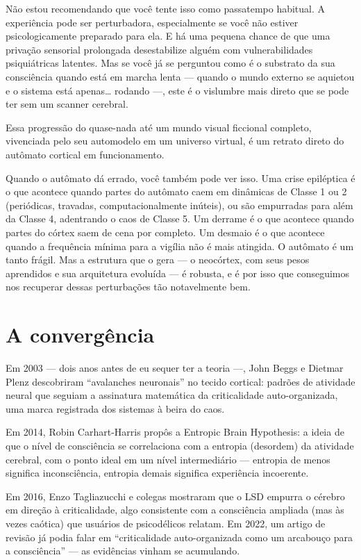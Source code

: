 \documentclass[11pt, twoside, openright]{book}
\begin{document}
Não estou recomendando que você tente isso como passatempo habitual. A experiência pode ser perturbadora, especialmente se você não estiver psicologicamente preparado para ela. E há uma pequena chance de que uma privação sensorial prolongada desestabilize alguém com vulnerabilidades psiquiátricas latentes. Mas se você já se perguntou como é o substrato da sua consciência quando está em marcha lenta --- quando o mundo externo se aquietou e o sistema está apenas… rodando ---, este é o vislumbre mais direto que se pode ter sem um scanner cerebral.

Essa progressão do quase-nada até um mundo visual ficcional completo, vivenciada pelo seu automodelo em um universo virtual, é um retrato direto do autômato cortical em funcionamento.

Quando o autômato dá errado, você também pode ver isso. Uma crise epiléptica é o que acontece quando partes do autômato caem em dinâmicas de Classe 1 ou 2 (periódicas, travadas, computacionalmente inúteis), ou são empurradas para além da Classe 4, adentrando o caos de Classe 5. Um derrame é o que acontece quando partes do córtex saem de cena por completo. Um desmaio é o que acontece quando a frequência mínima para a vigília não é mais atingida. O autômato é um tanto frágil. Mas a estrutura que o gera --- o neocórtex, com seus pesos aprendidos e sua arquitetura evoluída --- é robusta, e é por isso que conseguimos nos recuperar dessas perturbações tão notavelmente bem.

\section*{A convergência}

Em 2003 --- dois anos antes de eu sequer ter a teoria ---, John Beggs e Dietmar Plenz descobriram ``avalanches neuronais'' no tecido cortical: padrões de atividade neural que seguiam a assinatura matemática da criticalidade auto-organizada, uma marca registrada dos sistemas à beira do caos.

Em 2014, Robin Carhart-Harris propôs a Entropic Brain Hypothesis: a ideia de que o nível de consciência se correlaciona com a entropia (desordem) da atividade cerebral, com o ponto ideal em um nível intermediário --- entropia de menos significa inconsciência, entropia demais significa experiência incoerente.

Em 2016, Enzo Tagliazucchi e colegas mostraram que o LSD empurra o cérebro em direção à criticalidade, algo consistente com a consciência ampliada (mas às vezes caótica) que usuários de psicodélicos relatam. Em 2022, um artigo de revisão já podia falar em ``criticalidade auto-organizada como um arcabouço para a consciência'' --- as evidências vinham se acumulando.
\end{document}
